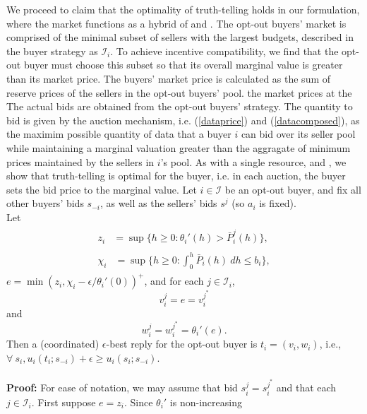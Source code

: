 \documentclass[12pt]{article}
\theoremstyle{definition}
\newcommand{\mcI}{\mathcal{I}}
\begin{document}
\begin{multicols}{2}
We proceed to claim that the optimality of truth-telling holds in our
formulation, where the market functions as a hybrid of \cite{semret} and
\cite{zheng}. The opt-out buyers' market is comprised of the minimal subset of
sellers with the largest budgets, described in the buyer strategy as $\mcI_i$.
To achieve incentive compatibility, we find that the opt-out buyer must choose this subset so that
its overall marginal value is greater than its market price.
The buyers' market price is calculated as the sum of reserve prices
of the sellers in the opt-out buyers' pool.
the market prices at the %
The actual bids are
obtained from the opt-out buyers' strategy. The quantity to bid is given
by the auction mechanism, i.e. (\ref{dataprice}) and (\ref{datacomposed}), as
the maximim possible quantity of data that a buyer $i$ can bid over its seller
pool while maintaining a marginal valuation greater than the aggragate of
minimum prices maintained by the sellers in $i$'s pool.
As with a single resource, \cite{semret} and
\cite{lazar}, we show that truth-telling is optimal for the buyer, i.e. in each auction, the buyer sets
the bid price to the marginal value.
{
\label{buyerincentivecompatibility}
Let $i\in\mcI$ be an opt-out buyer, and fix all other buyers' bids
$s_{-i}$, as well as the sellers' bids $s^j$ (so $a_i$ is fixed). \\
Let 
\begin{align}
\begin{split}
    z_i &= \sup\bigg\lbrace h\ge 0 : 
 {\theta_i}'(h) > \bar{P}_i^j(h)\bigg\rbrace, 
\end{split}\\
\begin{split}
    \chi_i &= \sup\bigg\lbrace h\ge 0: 
\displaystyle\int_0^h 
    \bar{P}_i(h) \ dh \le b_i\bigg\rbrace,
\end{split}
\end{align}
$e = \min(z_i, \chi_i - \epsilon / \theta_i'(0))^+$, and for each $j \in
\mcI_i$, 
$$
    v_i^j = e = v_i^{j^*}
$$
and 
$$
    w_i^j = w_i^{j^*} = \theta_i'(e).
$$
Then a (coordinated) $\epsilon$-best reply for the opt-out buyer is $t_i =
(v_i,w_i)$, i.e., $\forall \ s_i, u_i(t_i;s_{-i}) + \epsilon \ge u_i(s_i;
s_{-i})$.
} \\ \\
\textbf{Proof:} For ease of notation, we may assume that bid
$s_i^j=s_i^{j^*}$ and that each $j\in\mcI_i$.
First suppose $e = z_i$. Since $\theta_i'$ is non-increasing

\end{multicols}
\end{document}
